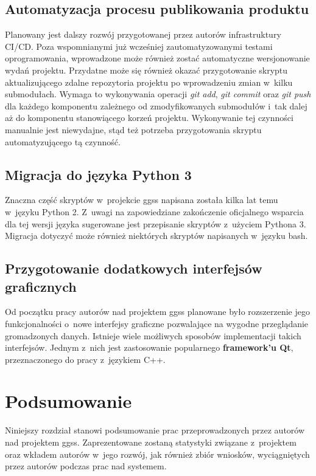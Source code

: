 \section{Automatyzacja procesu publikowania produktu}
Planowany jest dalszy rozwój przygotowanej przez autorów infrastruktury CI/CD. Poza wspomnianymi już wcześniej zautomatyzowanymi testami oprogramowania, wprowadzone może również zostać automatyczne wersjonowanie wydań projektu. Przydatne może się również okazać przygotowanie skryptu aktualizującego zdalne repozytoria projektu po wprowadzeniu zmian w~kilku submodułach. Wymaga to wykonywania operacji \textit{git add}, \textit{git commit} oraz \textit{git push} dla każdego komponentu zależnego od zmodyfikowanych submodułów i~tak dalej aż do komponentu stanowiącego korzeń projektu. Wykonywanie tej czynności manualnie jest niewydajne, stąd też potrzeba przygotowania skryptu automatyzującego tą czynność.


\section{Migracja do języka Python 3}
Znaczna część skryptów w~projekcie \gls*{ggss} napisana została kilka lat temu w~języku Python 2. Z~uwagi na zapowiedziane zakończenie oficjalnego wsparcia dla tej wersji języka sugerowane jest przepisanie skryptów z~użyciem Pythona 3. Migracja dotyczyć może również niektórych skryptów napisanych w~języku \gls*{bash}. 

\section{Przygotowanie dodatkowych interfejsów graficznych}
Od początku pracy autorów nad projektem \gls*{ggss} planowane było rozszerzenie jego funkcjonalności o~nowe interfejsy graficzne pozwalające na wygodne przeglądanie gromadzonych danych. Istnieje wiele możliwych sposobów implementacji takich interfejsów. Jednym z~nich jest zastosowanie popularnego \textbf{framework'u Qt}, przeznaczonego do pracy z~językiem C++. 


\chapter{Podsumowanie}
\label{cha:summary}
Niniejszy rozdział stanowi podsumowanie prac przeprowadzonych przez autorów nad projektem \gls*{ggss}. Zaprezentowane zostaną statystyki związane z~projektem oraz wkładem autorów w~jego rozwój, jak również zbiór wniosków, wyciągniętych przez autorów podczas prac nad systemem. 

